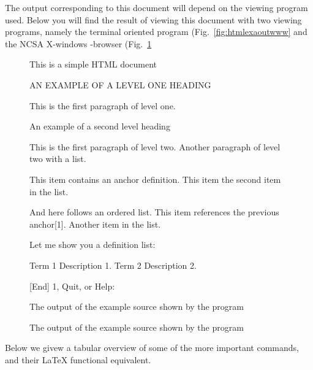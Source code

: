 The output corresponding to this document will depend on the
viewing program used.
Below you will find the result of viewing this document with two 
\Html{} viewing programs, namely
the terminal oriented program  (Fig.~\ref{fig:htmlexaoutwww}
and the NCSA X-windows \Html-browser \Xmosaic{} (Fig.~\ref{fig:htmlexaoutxmosaic}

\begin{figure}[p]
  \begin{sideways}
    \begin{minipage}[b]{0.999\textheight}%
\begin{minipage}[b]{.39\textwidth}
\begin{XMP}
\small               This is a simple HTML document

           AN EXAMPLE OF A LEVEL ONE HEADING

   This is the first paragraph of level one.

An example of a second level heading

   This is the first paragraph of level two.
   Another paragraph of level two with a list.

      This item contains an anchor definition.
      This item the second item in the list.

   And here follows an ordered list.
      This item references the previous anchor[1].
      Another item in the list.

   Let me show you a definition list:

  Term 1                 Description 1.
  Term 2                 Description 2.

     [End]
1, Quit, or Help:
\end{XMP}
\caption{The output of the example \protect\Html{} source 
         shown by the \protect{} program}
\label{fig:htmlexaoutwww}
\end{minipage}\hfill
\begin{minipage}[b]{.59\textwidth}
\caption{The output of the example \protect\Html{} source 
         shown by the \protect\Xmosaic{} program}
\label{fig:htmlexaoutxmosaic}
\end{minipage}
\end{minipage}
\end{sideways}
\end{figure}

Below we givew a tabular overview of some of the
more important commands, and their \LaTeX{} functional equivalent.

